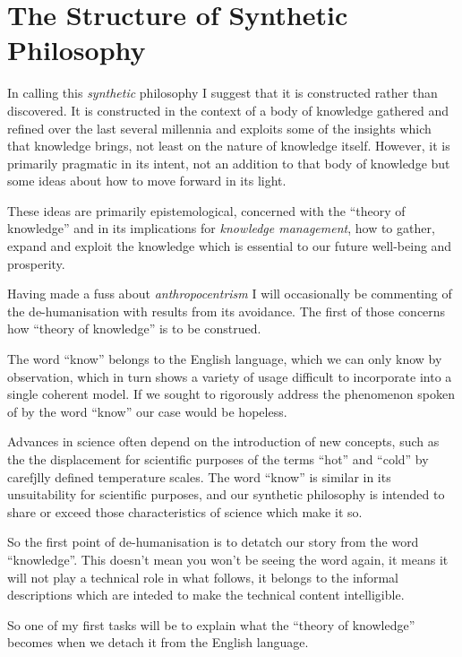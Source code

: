 \documentclass[10pt,titlepage]{book}
\begin{document}
\section{The Structure of Synthetic Philosophy}

In calling this \emph{synthetic} philosophy I suggest that it is constructed rather than discovered.
It is constructed in the context of a body of knowledge gathered and refined over the last several millennia and exploits some of the insights which that knowledge brings, not least on the nature of knowledge itself.
However, it is primarily pragmatic in its intent, not an addition to that body of knowledge but some ideas about how to move forward in its light.


These ideas are primarily epistemological, concerned with the ``theory of knowledge'' and in its implications for \emph{knowledge management}, how to gather, expand and exploit the knowledge which is essential to our future well-being and prosperity.

Having made a fuss about \emph{anthropocentrism} I will occasionally be commenting of the de-humanisation with results from its avoidance.
The first of those concerns how ``theory of knowledge'' is to be construed.

The word ``know'' belongs to the English language, which we can only know by observation, which in turn shows a variety of usage difficult to incorporate into a single coherent model.
If we sought to rigorously address the phenomenon spoken of by the word ``know'' our case would be hopeless.

Advances in science often depend on the introduction of new concepts, such as the the displacement for scientific purposes of the terms ``hot'' and ``cold'' by carefjlly defined temperature scales.
The word ``know'' is similar in its unsuitability for scientific purposes, and our synthetic philosophy is intended to share or exceed those characteristics of science which make it so.

So the first point of de-humanisation is to detatch our story from the word ``knowledge''.
This doesn't mean you won't be seeing the word again, it means it will not play a technical role in what follows, it belongs to the informal descriptions which are inteded to make the technical content intelligible.

So one of my first tasks will be to explain what the ``theory of knowledge'' becomes when we detach it from the English language.
\end{document}
